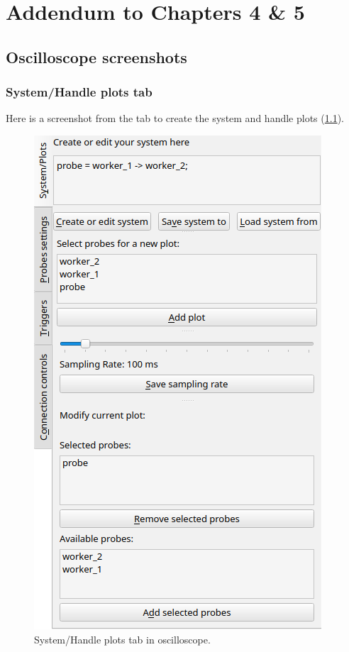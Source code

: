 \part{Addendum to Chapters 4 \& 5}
\chapter{Oscilloscope screenshots}

\section{System/Handle plots tab} \label{app:sidetab_ex}
    Here is a screenshot from the tab to create the system and handle plots (\cref{fig:sidetab_ex}).

    \begin{figure}[H]
        \begin{center}
            \includegraphics[scale = 0.6]{img/new_sys_cre.png}
        \end{center}
        \caption{System/Handle plots tab in oscilloscope.}
        \label{fig:sidetab_ex}
    \end{figure}

